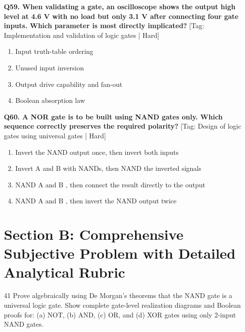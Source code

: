 \noindent\textbf{Q59. When validating a gate, an oscilloscope shows the output high level at 4.6 V with no load but only 3.1 V after connecting four gate inputs. Which parameter is most directly implicated?} \hfill [Tag: Implementation and validation of logic gates | Hard]
\begin{enumerate}[label=(\alph*),topsep=2pt,itemsep=1pt,partopsep=0pt,parsep=0pt]
    \item {Input truth-table ordering}
    \item {Unused input inversion}
    \item {Output drive capability and fan-out}
    \item {Boolean absorption law}
\end{enumerate}
\vspace{2mm}

\noindent\textbf{Q60. A NOR gate is to be built using NAND gates only. Which sequence correctly preserves the required polarity?} \hfill [Tag: Design of logic gates using universal gates | Hard]
\begin{enumerate}[label=(\alph*),topsep=2pt,itemsep=1pt,partopsep=0pt,parsep=0pt]
    \item {Invert the NAND output once, then invert both inputs}
    \item {Invert A and B with NANDs, then NAND the inverted signals}
    \item {NAND A and B , then connect the result directly to the output}
    \item {NAND A and B , then invert the NAND output twice}
\end{enumerate}
\vspace{2mm}


\newpage
\section{Section B: Comprehensive Subjective Problem with Detailed Analytical Rubric}

\begin{subjectiveq}{4}{1}
Prove algebraically using De Morgan's theorems that the NAND gate is a universal logic gate. Show complete gate-level realization diagrams and Boolean proofs for: (a) NOT, (b) AND, (c) OR, and (d) XOR gates using only 2-input NAND gates.
\end{subjectiveq}


